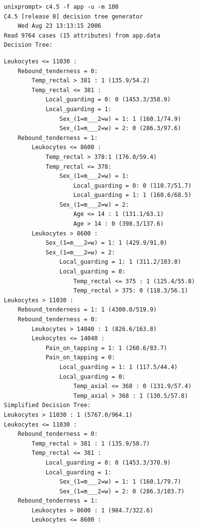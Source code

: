 \documentclass[10pt]{book}
\begin{document}
\begin{verbatim}
unixprompt> c4.5 -f app -u -m 100
C4.5 [release 8] decision tree generator
    Wed Aug 23 13:13:15 2006
Read 9764 cases (15 attributes) from app.data
Decision Tree:
\end{verbatim}

\begin{verbatim}
Leukocytes <= 11030 :
    Rebound_tenderness = 0:
        Temp_rectal > 381 : 1 (135.9/54.2)
        Temp_rectal <= 381 :
            Local_guarding = 0: 0 (1453.3/358.9)
            Local_guarding = 1:
                Sex_(1=m___2=w) = 1: 1 (160.1/74.9)
                Sex_(1=m___2=w) = 2: 0 (286.3/97.6)
    Rebound_tenderness = 1:
        Leukocytes <= 8600 :
            Temp_rectal > 378:1 (176.0/59.4)
            Temp_rectal <= 378:
                Sex_(1=m___2=w) = 1:
                    Local_guarding = 0: 0 (110.7/51.7)
                    Local_guarding = 1: 1 (160.6/68.5)
                Sex_(1=m___2=w) = 2:
                    Age <= 14 : 1 (131.1/63.1)
                    Age > 14 : 0 (398.3/137.6)
        Leukocytes > 8600 :
            Sex_(1=m___2=w) = 1: 1 (429.9/91.0)
            Sex_(1=m___2=w) = 2:
                Local_guarding = 1: 1 (311.2/103.0)
                Local_guarding = 0:
                    Temp_rectal <= 375 : 1 (125.4/55.8)
                    Temp_rectal > 375: 0 (118.3/56.1)
Leukocytes > 11030 :
    Rebound_tenderness = 1: 1 (4300.0/519.9)
    Rebound_tenderness = 0:
        Leukocytes > 14040 : 1 (826.6/163.8)
        Leukocytes <= 14040 :
            Pain_on_tapping = 1: 1 (260.6/83.7)
            Pain_on_tapping = 0:
                Local_guarding = 1: 1 (117.5/44.4)
                Local_guarding = 0:
                    Temp_axial <= 368 : 0 (131.9/57.4)
                    Temp_axial > 368 : 1 (130.5/57.8)
Simplified Decision Tree:
Leukocytes > 11030 : 1 (5767.0/964.1)
Leukocytes <= 11030 :
    Rebound_tenderness = 0:
        Temp_rectal > 381 : 1 (135.9/58.7)
        Temp_rectal <= 381 :
            Local_guarding = 0: 0 (1453.3/370.9)
            Local_guarding = 1:
                Sex_(1=m___2=w) = 1: 1 (160.1/79.7)
                Sex_(1=m___2=w) = 2: 0 (286.3/103.7)
    Rebound_tenderness = 1:
        Leukocytes > 8600 : 1 (984.7/322.6)
        Leukocytes <= 8600 :
\end{verbatim}
\end{document}

